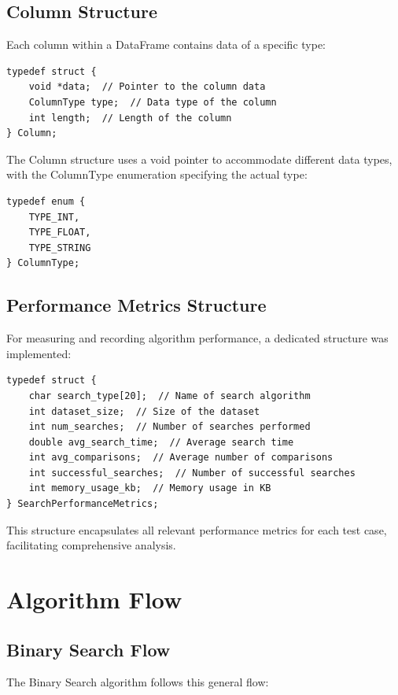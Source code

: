 \subsection{Column Structure}
Each column within a DataFrame contains data of a specific type:

\begin{lstlisting}[style=c]
typedef struct {
    void *data;  // Pointer to the column data
    ColumnType type;  // Data type of the column
    int length;  // Length of the column
} Column;
\end{lstlisting}

The Column structure uses a void pointer to accommodate different data types, with the ColumnType enumeration specifying the actual type:

\begin{lstlisting}[style=c]
typedef enum {
    TYPE_INT,
    TYPE_FLOAT,
    TYPE_STRING
} ColumnType;
\end{lstlisting}

\subsection{Performance Metrics Structure}
For measuring and recording algorithm performance, a dedicated structure was implemented:

\begin{lstlisting}[style=c]
typedef struct {
    char search_type[20];  // Name of search algorithm
    int dataset_size;  // Size of the dataset
    int num_searches;  // Number of searches performed
    double avg_search_time;  // Average search time
    int avg_comparisons;  // Average number of comparisons
    int successful_searches;  // Number of successful searches
    int memory_usage_kb;  // Memory usage in KB
} SearchPerformanceMetrics;
\end{lstlisting}

This structure encapsulates all relevant performance metrics for each test case, facilitating comprehensive analysis.

\section{Algorithm Flow}

\subsection{Binary Search Flow}
The Binary Search algorithm follows this general flow:

